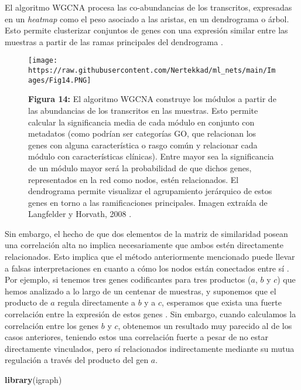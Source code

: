 \documentclass[
]{book}
\newenvironment{Shaded}{\begin{snugshade}}{\end{snugshade}}
\newcommand{\KeywordTok}[1]{\textcolor[rgb]{0.13,0.29,0.53}{\textbf{#1}}}
\newcommand{\NormalTok}[1]{#1}
\begin{document}
El algoritmo WGCNA procesa las co-abundancias de los transcritos, expresadas en un \emph{heatmap} como el peso asociado a las aristas, en un dendrograma o árbol. Esto permite clusterizar conjuntos de genes con una expresión similar entre las muestras a partir de las ramas principales del dendrograma \citep{zhang2005general}.

\begin{figure}
\centering
\texttt{[image: https://raw.githubusercontent.com/Nertekkad/ml\_nets/main/Images/Fig14.PNG]}
\caption{\textbf{Figura 14:} El algoritmo WGCNA construye los módulos a partir de las abundancias de los transcritos en las muestras. Esto permite calcular la significancia media de cada módulo en conjunto con metadatos (como podrían ser categorías GO, que relacionan los genes con alguna característica o rasgo común y relacionar cada módulo con características clínicas). Entre mayor sea la significancia de un módulo mayor será la probabilidad de que dichos genes, representados en la red como nodos, estén relacionados. El dendrograma permite visualizar el agrupamiento jerárquico de estos genes en torno a las ramificaciones principales. Imagen extraída de Langfelder y Horvath, 2008 \citep{langfelder2008wgcna}.}
\end{figure}

Sin embargo, el hecho de que dos elementos de la matriz de similaridad posean una correlación alta no implica necesariamente que ambos estén directamente relacionados. Esto implica que el método anteriormente mencionado puede llevar a falsas interpretaciones en cuanto a cómo los nodos están conectados entre sí \citep{butte1999mutual}. Por ejemplo, si tenemos tres genes codificantes para tres productos (\(a\), \(b\) y \(c\)) que hemos analizado a lo largo de un centenar de muestras, y suponemos que el producto de \(a\) regula directamente a \(b\) y a \(c\), esperamos que exista una fuerte correlación entre la expresión de estos genes \citep{villaintroduction}. Sin embargo, cuando calculamos la correlación entre los genes \(b\) y \(c\), obtenemos un resultado muy parecido al de los casos anteriores, teniendo estos una correlación fuerte a pesar de no estar directamente vinculados, pero sí relacionados indirectamente mediante su mutua regulación a través del producto del gen \(a\).

\begin{Shaded}
\begin{Highlighting}[]
\KeywordTok{library}\NormalTok{(igraph)}
\end{Highlighting}
\end{Shaded}
\end{document}
